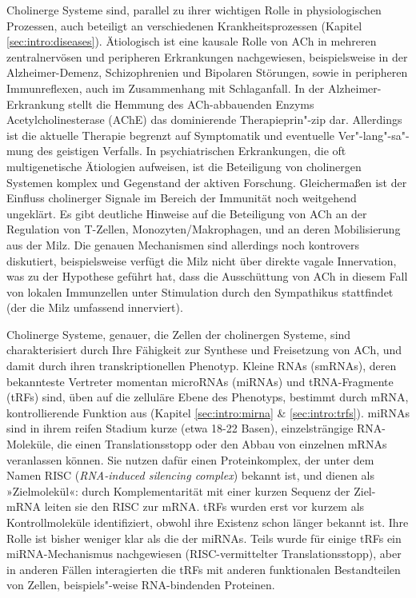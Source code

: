 Cholinerge Systeme sind, parallel zu ihrer wichtigen Rolle in physiologischen Prozessen, auch beteiligt an verschiedenen Krankheitsprozessen (Kapitel \ref{sec:intro:diseases}). Ätiologisch ist eine kausale Rolle von ACh in mehreren zentralnervösen und peripheren Erkrankungen nachgewiesen, beispielsweise in der Alzheimer-Demenz, Schizophrenien und Bipolaren Störungen, sowie in peripheren Immunreflexen, auch im Zusammenhang mit Schlaganfall. In der Alzheimer-Erkrankung stellt die Hemmung des ACh-abbauenden Enzyms Acetylcholinesterase (AChE) das dominierende Therapieprin"-zip dar. Allerdings ist die aktuelle Therapie begrenzt auf Symptomatik und eventuelle Ver"-lang"-sa"-mung des geistigen Verfalls. In psychiatrischen Erkrankungen, die oft multigenetische Ätiologien aufweisen, ist die Beteiligung von cholinergen Systemen komplex und Gegenstand der aktiven Forschung. Gleichermaßen ist der Einfluss cholinerger Signale im Bereich der Immunität noch weitgehend ungeklärt. Es gibt deutliche Hinweise auf die Beteiligung von ACh an der Regulation von T-Zellen, Monozyten/Makrophagen, und an deren Mobilisierung aus der Milz. Die genauen Mechanismen sind allerdings noch kontrovers diskutiert, beispielsweise verfügt die Milz nicht über direkte vagale Innervation, was zu der Hypothese geführt hat, dass die Ausschüttung von ACh in diesem Fall von lokalen Immunzellen unter Stimulation durch den Sympathikus stattfindet (der die Milz umfassend innerviert).

Cholinerge Systeme, genauer, die Zellen der cholinergen Systeme, sind charakterisiert durch Ihre Fähigkeit zur Synthese und Freisetzung von ACh, und damit durch ihren transkriptionellen Phenotyp. Kleine RNAs (smRNAs), deren bekannteste Vertreter momentan microRNAs (miRNAs) und tRNA-Fragmente (tRFs) sind, üben auf die zelluläre Ebene des Phenotyps, bestimmt durch mRNA, kontrollierende Funktion aus (Kapitel \ref{sec:intro:mirna} \& \ref{sec:intro:trfs}). miRNAs sind in ihrem reifen Stadium kurze (etwa 18-22 Basen), einzelsträngige RNA-Moleküle, die einen Translationsstopp oder den Abbau von einzelnen mRNAs veranlassen können. Sie nutzen dafür einen Proteinkomplex, der unter dem Namen RISC (\emph{RNA-induced silencing complex}) bekannt ist, und dienen als »Zielmolekül«: durch Komplementarität mit einer kurzen Sequenz der Ziel-mRNA leiten sie den RISC zur mRNA. tRFs wurden erst vor kurzem als Kontrollmoleküle identifiziert, obwohl ihre Existenz schon länger bekannt ist. Ihre Rolle ist bisher weniger klar als die der miRNAs. Teils wurde für einige tRFs ein miRNA-Mechanismus nachgewiesen (RISC-vermittelter Translationsstopp), aber in anderen Fällen interagierten die tRFs mit anderen funktionalen Bestandteilen von Zellen, beispiels"-weise RNA-bindenden Proteinen.

